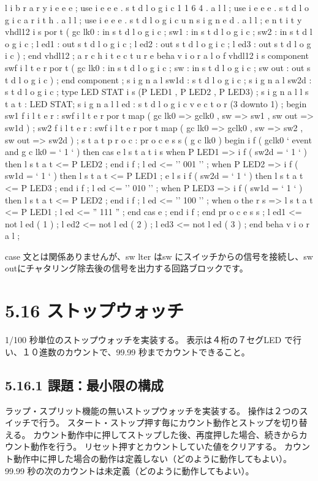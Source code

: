\documentclass[letterpaper,10pt,dvipdfmx]{sphinxmanual}
\begin{document}
l i b r a r y i e e e ;
use i e e e . s t d l o g i c 1 1 6 4 . a l l ;
use i e e e . s t d l o g i c a r i t h . a l l ;
use i e e e . s t d l o g i c u n s i g n e d . a l l ;
e n t i t y vhdl12 i s
por t (
gc lk0 : in s t d l o g i c ;
sw1 : in s t d l o g i c ;
sw2 : in s t d l o g i c ;
l ed1 : out s t d l o g i c ;
l ed2 : out s t d l o g i c ;
l ed3 : out s t d l o g i c
) ;
end vhdl12 ;
a r c h i t e c t u r e beha v i o r a l o f vhdl12 i s
component swf i l t e r
por t (
gc lk0 : in s t d l o g i c ;
sw : in s t d l o g i c ;
sw out : out s t d l o g i c
) ;
end component ;
s i g n a l sw1d : s t d l o g i c ;
s i g n a l sw2d : s t d l o g i c ;
type LED STAT i s (P LED1 , P LED2 , P LED3) ;
s i g n a l l s t a t : LED STAT;
s i g n a l l ed : s t d l o g i c v e c t o r (3 downto 1) ;
begin
sw1 f i l t e r : swf i l t e r
por t map (
gc lk0 =\textgreater{} gclk0 ,
sw =\textgreater{} sw1 ,
sw out =\textgreater{} sw1d
) ;
sw2 f i l t e r : swf i l t e r
por t map (
gc lk0 =\textgreater{} gclk0 ,
sw =\textgreater{} sw2 ,
sw out =\textgreater{} sw2d
) ;
s t a t p r o c : pr o c e s s ( g c lk0 )
begin
i f ( gclk0 ` event and g c lk0 = ` 1 ` ) then
cas e l s t a t i s
when P LED1 =\textgreater{}
i f ( sw2d = ` 1 ` ) then
l s t a t \textless{}= P LED2 ;
end i f ;
l ed \textless{}= '' 001 '' ;
when P LED2 =\textgreater{}
i f ( sw1d = ` 1 ` ) then
l s t a t \textless{}= P LED1 ;
e l s i f ( sw2d = ` 1 ` ) then
l s t a t \textless{}= P LED3 ;
end i f ;
l ed \textless{}= '' 010 '' ;
when P LED3 =\textgreater{}
i f ( sw1d = ` 1 ` ) then
l s t a t \textless{}= P LED2 ;
end i f ;
l ed \textless{}= '' 100 '' ;
when o the r s =\textgreater{}
l s t a t \textless{}= P LED1 ;
l ed \textless{}= '' 111 '' ;
end cas e ;
end i f ;
end pr o c e s s ;
l ed1 \textless{}= not l ed ( 1 ) ;
l ed2 \textless{}= not l ed ( 2 ) ;
l ed3 \textless{}= not l ed ( 3 ) ;
end beha v i o r a l ;

case 文とは関係ありませんが、sw lter はsw にスイッチからの信号を接続し、sw outにチャタリング除去後の信号を出力する回路ブロックです。


\section{5.16 ストップウォッチ}
\label{05_try:id25}
1/100 秒単位のストップウォッチを実装する。
表示は４桁の７セグLED で行い、１０進数のカウントで、99.99 秒までカウントできること。


\subsection{5.16.1 課題：最小限の構成}
\label{05_try:id26}
ラップ・スプリット機能の無いストップウォッチを実装する。
操作は２つのスイッチで行う。
スタート・ストップ押す毎にカウント動作とストップを切り替える。
カウント動作中に押してストップした後、再度押した場合、続きからカウント動作を行う。
リセット押すとカウントしていた値をクリアする。
カウント動作中に押した場合の動作は定義しない（どのように動作してもよい）。
99.99 秒の次のカウントは未定義（どのように動作してもよい）。
\end{document}
